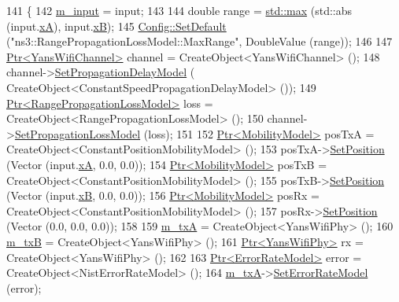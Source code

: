 \begin{DoxyCode}
141 \{
142   \hyperlink{classInterferenceExperiment_a36c38e073c0d336135f6ff16b0cdaeac}{m\_input} = input;
143 
144   \textcolor{keywordtype}{double} range = \hyperlink{80211b_8c_affe776513b24d84b39af8ab0930fef7f}{std::max} (std::abs (input.\hyperlink{structInterferenceExperiment_1_1Input_a6af2867adbbc4728d94b1a2591b8e12d}{xA}), input.\hyperlink{structInterferenceExperiment_1_1Input_a87cb6a23e8a0cd61578537cc093acba5}{xB});
145   \hyperlink{group__config_ga2e7882df849d8ba4aaad31c934c40c06}{Config::SetDefault} (\textcolor{stringliteral}{"ns3::RangePropagationLossModel::MaxRange"}, DoubleValue (range));
146 
147   \hyperlink{classns3_1_1Ptr}{Ptr<YansWifiChannel>} channel = CreateObject<YansWifiChannel> ();
148   channel->\hyperlink{classns3_1_1YansWifiChannel_a51ebdd5a1d897dc46cf9783ac2879b98}{SetPropagationDelayModel} (
      CreateObject<ConstantSpeedPropagationDelayModel> ());
149   \hyperlink{classns3_1_1Ptr}{Ptr<RangePropagationLossModel>} loss = 
      CreateObject<RangePropagationLossModel> ();
150   channel->\hyperlink{classns3_1_1YansWifiChannel_ad2f92be1fb34be0075141cbb4f779191}{SetPropagationLossModel} (loss);
151 
152   \hyperlink{classns3_1_1Ptr}{Ptr<MobilityModel>} posTxA = CreateObject<ConstantPositionMobilityModel> ();
153   posTxA->\hyperlink{classns3_1_1MobilityModel_ac584b3d5a309709d2f13ed6ada1e7640}{SetPosition} (Vector (input.\hyperlink{structInterferenceExperiment_1_1Input_a6af2867adbbc4728d94b1a2591b8e12d}{xA}, 0.0, 0.0));
154   \hyperlink{classns3_1_1Ptr}{Ptr<MobilityModel>} posTxB = CreateObject<ConstantPositionMobilityModel> ();
155   posTxB->\hyperlink{classns3_1_1MobilityModel_ac584b3d5a309709d2f13ed6ada1e7640}{SetPosition} (Vector (input.\hyperlink{structInterferenceExperiment_1_1Input_a87cb6a23e8a0cd61578537cc093acba5}{xB}, 0.0, 0.0));
156   \hyperlink{classns3_1_1Ptr}{Ptr<MobilityModel>} posRx = CreateObject<ConstantPositionMobilityModel> ();
157   posRx->\hyperlink{classns3_1_1MobilityModel_ac584b3d5a309709d2f13ed6ada1e7640}{SetPosition} (Vector (0.0, 0.0, 0.0));
158 
159   \hyperlink{classInterferenceExperiment_aac9b38170603ebf4d3c4565deaa8f0a7}{m\_txA} = CreateObject<YansWifiPhy> ();
160   \hyperlink{classInterferenceExperiment_ac2071a3bf35e68a316a7d251327d5708}{m\_txB} = CreateObject<YansWifiPhy> ();
161   \hyperlink{classns3_1_1Ptr}{Ptr<YansWifiPhy>} rx = CreateObject<YansWifiPhy> ();
162 
163   \hyperlink{classns3_1_1Ptr}{Ptr<ErrorRateModel>} error = CreateObject<NistErrorRateModel> ();
164   \hyperlink{classInterferenceExperiment_aac9b38170603ebf4d3c4565deaa8f0a7}{m\_txA}->\hyperlink{classns3_1_1WifiPhy_ac363f667899a813bb1331225bc1c1474}{SetErrorRateModel} (error);

\end{DoxyCode}
